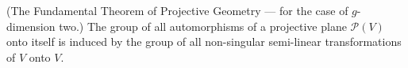 (The Fundamental Theorem of Projective Geometry --- for the case of $g$-dimension two.) The group of all automorphisms of a projective plane $\mathcal{P}(V)$ onto itself is induced by the group of all non-singular semi-linear transformations of $V$ onto $V$.
